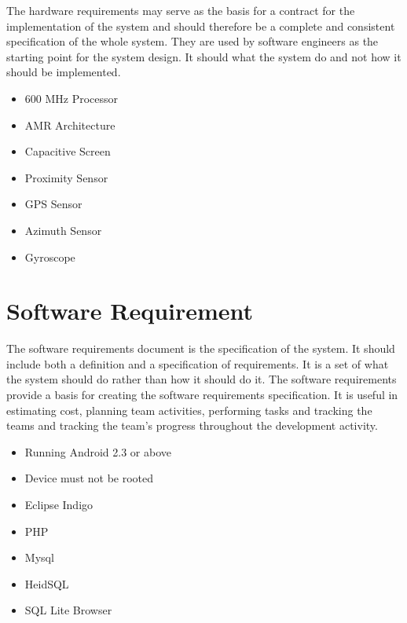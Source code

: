 	The hardware requirements may serve as the basis for a contract for the implementation of the system and should therefore be a complete and consistent specification of the whole system. They are used by software engineers as the starting point for the system design. It should what the system do and not how it should be implemented.
	
	\begin{itemize}
	
	\item 600 MHz Processor
	\item AMR Architecture
	\item Capacitive Screen
	\item Proximity Sensor
	\item GPS Sensor
	\item Azimuth Sensor
	\item Gyroscope
	\end{itemize} 
	

	
	
	
	
	\section{Software Requirement }
	
	The software requirements document is the specification of the system. It should include both a definition and a specification of requirements. It is a set of what the system should do rather than how it should do it. The software requirements provide a basis for creating the software requirements specification.  It is useful in estimating cost, planning team activities, performing tasks and tracking the teams and tracking the team's progress throughout the development activity.
	
	\begin{itemize}
	
	\item Running Android 2.3 or above
	\item Device must not be rooted 
	\item Eclipse Indigo
	\item PHP 
	\item Mysql
	\item HeidSQL
	\item SQL Lite Browser
	\end{itemize}
	
	
	
	
	
	
	
